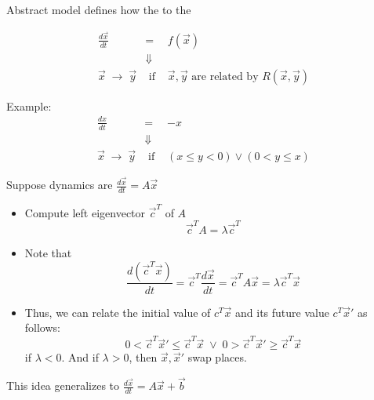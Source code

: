 \documentclass{seminar}
\begin{document}
\begin{slide}

Abstract model defines how the {}
{} to the {}

\begin{eqnarray}
 \frac{d\vec{x}}{dt} & = & f(\vec{x})
\\ & \Downarrow &
\\ 
 \vec{x}\;\rightarrow\;\vec{y} & \mbox{ if } &
 \vec{x},\vec{y} \mbox{ are related by } R(\vec{x},\vec{y})
\end{eqnarray}

\bigskip
Example:
\begin{eqnarray}
 \frac{dx}{dt} & = & -x
\\ & \Downarrow &
\\ 
 \vec{x}\;\rightarrow\;\vec{y} & \mbox{ if } &
(x \leq y < 0) \vee (0 < y \leq x) 
\end{eqnarray}

\end{slide}
\begin{slide}

Suppose dynamics are $\frac{d\vec{x}}{dt} = A\vec{x}$

\begin{itemize}
\item Compute left eigenvector $\vec{c}^T$ of $A$
$$  \vec{c}^T A  = \lambda \vec{c}^T $$
\item
 Note that 
$$
 \frac{d(\vec{c}^T \vec{x})}{dt} =
 \vec{c}^T\frac{d\vec{x}}{dt} =
 \vec{c}^T A\vec{x} = \lambda \vec{c}^T\vec{x}
$$
\item
 Thus, we can relate the initial value of $c^T\vec{x}$ 
 and its future value $c^T\vec{x}'$ as follows:
$$
 0 < \vec{c}^T\vec{x}' \leq \vec{c}^T\vec{x}  \;\vee\;
 0 > \vec{c}^T\vec{x}' \geq \vec{c}^T\vec{x} 
$$
if $\lambda < 0$.  And if $\lambda > 0$, then $\vec{x},\vec{x}'$ swap places.
\end{itemize}

This idea generalizes to $\frac{d\vec{x}}{dt} = A\vec{x} + \vec{b}$

\end{slide}
\end{document}

